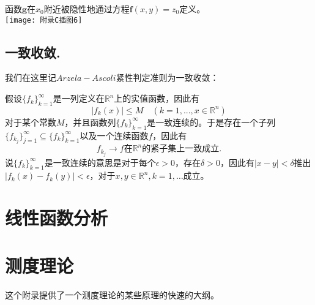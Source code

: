 \documentclass[leqno]{article}%
\begin{document}
函数$\mathbf{g}$在$x_{0}$附近被隐性地通过方程$\mathbf{f}(x,y)=z_{0}$定义。
\vspace{1ex}
\\
\texttt{[image: 附录C插图6]}




\subsection{一致收敛.}
我们在这里记$Arzela-Ascoli$紧性判定准则为一致收敛：\par
假设$\{f_{k}\}_{k=1}^{\infty}$是一列定义在$\mathbb{R}^{n}$上的实值函数，因此有
\begin{equation*}
|f_{k}(x)|\leq M\quad (k=1,...,x\in\mathbb{R}^{n})
\end{equation*}
对于某个常数$M$，并且函数列$\{f_{k}\}_{k=1}^{\infty}$是一致连续的。于是存在一个子列$\{f_{k_{j}}\}_{j=1}^{\infty}\subseteq\{f_{k}\}_{k=1}^{\infty}$以及一个连续函数$f$，因此有
\begin{equation*}
f_{k_{j}}\rightarrow f\text{在}\mathbb{R}^{n}\text{的紧子集上一致成立}.
\end{equation*}
说$\{f_{k}\}_{k=1}^{\infty}$是一致连续的意思是对于每个$\epsilon>0$，存在$\delta>0$，因此有$|x-y|<\delta$推出$|f_{k}(x)-f_{k}(y)|<\epsilon$，对于$x,y\in\mathbb{R}^{n},k=1,\ldots$成立。









	
\section{线性函数分析}
\section{测度理论}
	这个附录提供了一个测度理论的某些原理的快速的大纲。
\end{document}
